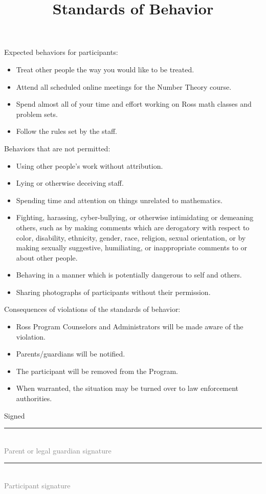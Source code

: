 \documentclass{ross}
\title{Standards of Behavior}
\begin{document}
\maketitle
Expected behaviors for participants:
\begin{itemize}
\item Treat other people the way you would like to be treated.
\item Attend all scheduled online meetings for the Number Theory course.
\item Spend almost all of your time and effort working on Ross math classes and\\ problem sets.
\item Follow the rules set by the staff.
\end{itemize}

Behaviors that are not permitted:
\begin{itemize}
\item Using other people's work without attribution.
\item Lying or otherwise deceiving staff.
\item Spending time and attention on things unrelated to mathematics.
\item Fighting, harassing, cyber-bullying, or otherwise intimidating or demeaning others, such as by making comments which are derogatory with respect to color, disability, ethnicity, gender, race, religion, sexual orientation, or by making sexually suggestive, humiliating, or inappropriate comments to or about other people.
\item Behaving in a manner which is potentially dangerous to self and others.
\item Sharing photographs of participants without their permission.
\end{itemize}

Consequences of violations of the standards of behavior:
\begin{itemize}
\item Ross Program Counselors and Administrators will be made aware of
  the violation.
\item Parents/guardians will be notified.
\item The participant will be removed from the Program.
\item When warranted, the situation may be turned over to law
  enforcement authorities.
\end{itemize}

\vspace{0.5in}
\hfill Signed \rule{3in}{0.1mm}\\[-1.5mm]
\hspace*{3.7in} {\footnotesize \textcolor{gray}{Parent or legal guardian signature} }


\vspace{0.5in}

\hfill  \rule{3in}{0.1mm}\\[-1.5mm]
\hspace*{3.7in} {\footnotesize \textcolor{gray}{Participant signature} }


\end{document}
